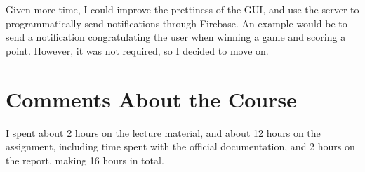 \documentclass[a4paper]{scrartcl}
\begin{document}
Given more time, I could improve the prettiness of the GUI, and use the server to programmatically send notifications through Firebase. An example would be to send a notification congratulating the user when winning a game and scoring a point. However, it was not required, so I decided to move on.

\section{Comments About the Course}

I spent about 2 hours on the lecture material, and about 12 hours on the assignment, including time spent with the official documentation, and 2 hours on the report, making 16 hours in total.
\end{document}
